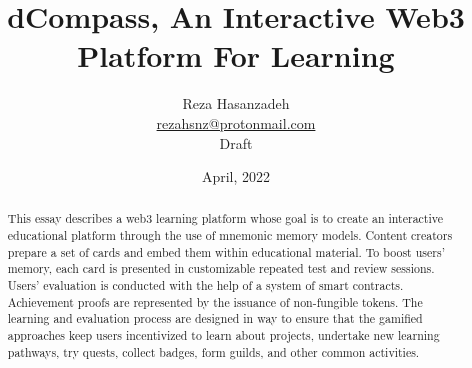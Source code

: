 \documentclass[12pt, a4paper]{article}
\title{dCompass, An Interactive Web3 Platform For Learning}
\author{Reza Hasanzadeh \\ \href{mailto:rezahsnz@protonmail.com}{rezahsnz@protonmail.com} \\ Draft}
\date{April, 2022}
\begin{document}
\maketitle

\begin{abstract}
This essay describes a web3 learning platform whose goal is to create an interactive educational platform through the use of mnemonic memory models. Content creators prepare a set of cards and embed them within educational material. To boost users’ memory, each card is presented in customizable repeated test and review sessions. Users' evaluation is conducted with the help of a system of smart contracts. Achievement proofs are represented by the issuance of non-fungible tokens. The learning and evaluation process are designed in way to ensure that the gamified approaches keep users incentivized to learn about projects, undertake new learning pathways, try quests, collect badges, form guilds, and other common activities.
\end{abstract}
\end{document}
